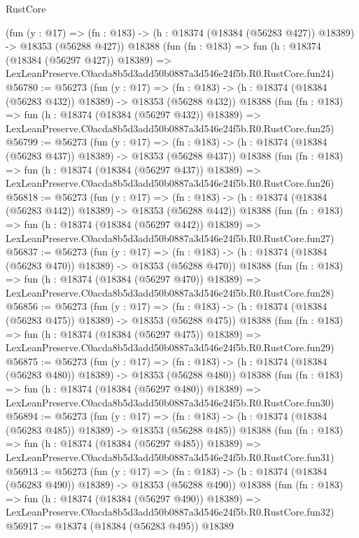 \begin{lexlean}{RustCore}
\begin{coremodule}
    (fun (y : @17) =>
    (fn : @183) -> (h : @18374 (@18384 (@56283 @427)) @18389) -> @18353 (@56288 @427))
    @18388
    (fun (fn : @183) =>
    fun (h : @18374 (@18384 (@56297 @427)) @18389) =>
    LexLeanPreserve.C0acda8b5d3add50b0887a3d546e24f5b.R0.RustCore.fun24)
@56780 := @56273
    (fun (y : @17) =>
    (fn : @183) -> (h : @18374 (@18384 (@56283 @432)) @18389) -> @18353 (@56288 @432))
    @18388
    (fun (fn : @183) =>
    fun (h : @18374 (@18384 (@56297 @432)) @18389) =>
    LexLeanPreserve.C0acda8b5d3add50b0887a3d546e24f5b.R0.RustCore.fun25)
@56799 := @56273
    (fun (y : @17) =>
    (fn : @183) -> (h : @18374 (@18384 (@56283 @437)) @18389) -> @18353 (@56288 @437))
    @18388
    (fun (fn : @183) =>
    fun (h : @18374 (@18384 (@56297 @437)) @18389) =>
    LexLeanPreserve.C0acda8b5d3add50b0887a3d546e24f5b.R0.RustCore.fun26)
@56818 := @56273
    (fun (y : @17) =>
    (fn : @183) -> (h : @18374 (@18384 (@56283 @442)) @18389) -> @18353 (@56288 @442))
    @18388
    (fun (fn : @183) =>
    fun (h : @18374 (@18384 (@56297 @442)) @18389) =>
    LexLeanPreserve.C0acda8b5d3add50b0887a3d546e24f5b.R0.RustCore.fun27)
@56837 := @56273
    (fun (y : @17) =>
    (fn : @183) -> (h : @18374 (@18384 (@56283 @470)) @18389) -> @18353 (@56288 @470))
    @18388
    (fun (fn : @183) =>
    fun (h : @18374 (@18384 (@56297 @470)) @18389) =>
    LexLeanPreserve.C0acda8b5d3add50b0887a3d546e24f5b.R0.RustCore.fun28)
@56856 := @56273
    (fun (y : @17) =>
    (fn : @183) -> (h : @18374 (@18384 (@56283 @475)) @18389) -> @18353 (@56288 @475))
    @18388
    (fun (fn : @183) =>
    fun (h : @18374 (@18384 (@56297 @475)) @18389) =>
    LexLeanPreserve.C0acda8b5d3add50b0887a3d546e24f5b.R0.RustCore.fun29)
@56875 := @56273
    (fun (y : @17) =>
    (fn : @183) -> (h : @18374 (@18384 (@56283 @480)) @18389) -> @18353 (@56288 @480))
    @18388
    (fun (fn : @183) =>
    fun (h : @18374 (@18384 (@56297 @480)) @18389) =>
    LexLeanPreserve.C0acda8b5d3add50b0887a3d546e24f5b.R0.RustCore.fun30)
@56894 := @56273
    (fun (y : @17) =>
    (fn : @183) -> (h : @18374 (@18384 (@56283 @485)) @18389) -> @18353 (@56288 @485))
    @18388
    (fun (fn : @183) =>
    fun (h : @18374 (@18384 (@56297 @485)) @18389) =>
    LexLeanPreserve.C0acda8b5d3add50b0887a3d546e24f5b.R0.RustCore.fun31)
@56913 := @56273
    (fun (y : @17) =>
    (fn : @183) -> (h : @18374 (@18384 (@56283 @490)) @18389) -> @18353 (@56288 @490))
    @18388
    (fun (fn : @183) =>
    fun (h : @18374 (@18384 (@56297 @490)) @18389) =>
    LexLeanPreserve.C0acda8b5d3add50b0887a3d546e24f5b.R0.RustCore.fun32)
@56917 := @18374 (@18384 (@56283 @495)) @18389

\end{coremodule}
\end{lexlean}
